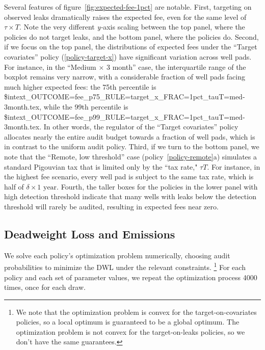Several features of figure~\ref{fig:expected-fee-1pct} are notable.
First, targeting on observed leaks dramatically raises the expected fee, even for the same level of \(\tau \times T\).
Note the very different \textit{y-}axis scaling between the top panel, where the policies do not target leaks, and the bottom panel, where the policies do.
Second, if we focus on the top panel, the distributions of expected fees under the ``Target covariates'' policy (\ref{policy-target-x}) have significant variation across well pads.
For instance, in the ``Medium \(\times\) 3 month'' case, the interquartile range of the boxplot remains very narrow, with a considerable fraction of well pads facing much higher expected fees:
the 75th percentile is
\${intext_OUTCOME=fee_p75_RULE=target_x_FRAC=1pct_tauT=med-3month.tex},
while the 99th percentile is
\${intext_OUTCOME=fee_p99_RULE=target_x_FRAC=1pct_tauT=med-3month.tex}.
In other words, the regulator of the ``Target covariates'' policy allocates nearly the entire audit budget towards a fraction of well pads, which is in contrast to the uniform audit policy.
Third, if we turn to the bottom panel, we note that the ``Remote, low threshold'' case (policy~\ref{policy-remote}a) simulates a standard Pigouvian tax that is limited only by the ``tax rate," \(\tau T\).
For instance, in the highest fee scenario, every well pad is subject to the same tax rate, which is half of \(\delta \times \text{1 year}\).
Fourth, the taller boxes for the policies in the lower panel with high detection threshold indicate that many wells with leaks below the detection threshold will rarely be audited, resulting in expected fees near zero.


\subsection{Deadweight Loss and Emissions}
\label{sec:dwl-and-emissions}


We solve each policy's optimization problem numerically, choosing audit probabilities to minimize the \gls{DWL} under the relevant constraints.%
\footnote{%
We note that the optimization problem is convex for the target-on-covariates policies, so a local optimum is guaranteed to be a global optimum.
The optimization problem is not convex for the target-on-leaks policies, so we don't have the same guarantees.
}
For each policy and each set of parameter values, we repeat the optimization process 4000 times, once for each draw.


